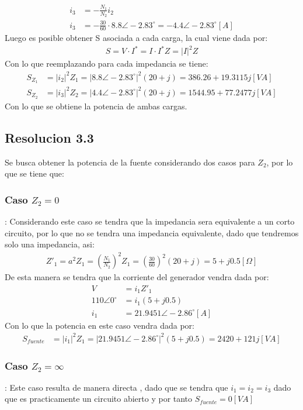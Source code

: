\documentclass[
  11pt,
  letterpaper,
   addpoints,
   answers
  ]{exam}
\begin{document}
\begin{questions}
\begin{solution}
\begin{align}
    i_{3} &= -\frac{N_{1}}{N_{2}}i_{2}\\
    i_{3} &= -\frac{30}{60} \cdot 8.8\angle -2.83^{\circ} = -4.4\angle -2.83^{\circ} [A]
\end{align}
Luego es posible obtener S asociada a cada carga, la cual viene dada por:
\begin{align}
    S= V \cdot I^{*} = I \cdot I^{*}Z = |I|^{2}Z
\end{align}
Con lo que reemplazando para cada impedancia se tiene:
\begin{align}
    S_{Z_{1}} &= |i_{2}|^{2}Z_{1}= |8.8\angle -2.83^{\circ}|^{2}(20+j) = 386.26 + 19.3115j [VA]\\
    S_{Z_{2}} & = |i_{3}|^{2}Z_{2}= |4.4\angle -2.83^{\circ}|^{2}(20+j) = 1544.95 + 77.2477j [VA]
\end{align}
Con lo que se obtiene la potencia de ambas cargas.
\subsection*{Resolucion 3.3}
Se busca obtener la potencia de la fuente considerando dos casos para $Z_{2}$, por lo que se tiene que:
\subsubsection*{\textbf{Caso $Z_{2}=0$}}:
Considerando este caso se tendra que la impedancia sera equivalente a un corto circuito, por lo que no se tendra una impedancia equivalente, dado que tendremos solo una impedancia, asi:
\begin{align}
    Z'_{1}= a^{2}Z_{1}= \left(\frac{N_{1}}{N_{2}}\right)^{2}Z_{1} = \left(\frac{30}{60}\right)^{2}(20 + j) = 5 + j0.5 [\Omega]
\end{align}
De esta manera se tendra que la corriente del generador vendra dada por:
\begin{align}
    V &= i_{1}Z'_{1}\\
    110\angle 0^{\circ} &= i_{1}(5 + j0.5)\\
    i_{1} &= 21.9451\angle -2.86^{\circ} [A]
\end{align}
Con lo que la potencia en este caso vendra dada por:
\begin{align}
    S_{fuente} &= |i_{1}|^{2}Z_{1} = |21.9451\angle -2.86^{\circ}|^{2}(5+j0.5) = 2420 + 121j [VA]
\end{align}
\subsubsection*{\textbf{Caso $Z_{2}=\infty$}}:
Este caso resulta de manera directa , dado que se tendra que $i_{1}= i_{2}=i_{3}$ dado que es practicamente un circuito abierto y por tanto $S_{fuente} = 0 [VA]$

\end{solution}

\end{questions}
\newpage
\end{document}
